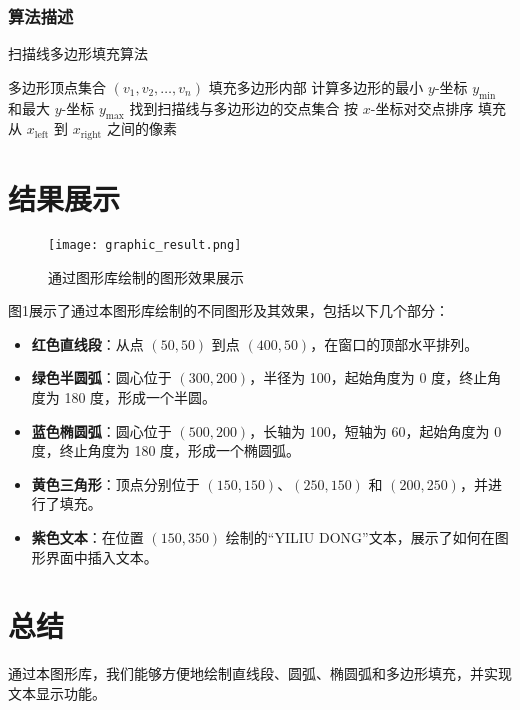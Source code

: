 \documentclass[11pt,a4paper]{article}
\begin{document}
\subsubsection{算法描述}
\begin{algorithm}[H]
\caption{扫描线多边形填充算法}
\begin{algorithmic}[1]
\Require 多边形顶点集合 \((v_1, v_2, \dots, v_n)\)
\Ensure 填充多边形内部
\State 计算多边形的最小 \(y\)-坐标 \(y_{\text{min}}\) 和最大 \(y\)-坐标 \(y_{\text{max}}\)
    \State 找到扫描线与多边形边的交点集合
    \State 按 \(x\)-坐标对交点排序
        \State 填充从 \(x_{\text{left}}\) 到 \(x_{\text{right}}\) 之间的像素
    \EndFor
\EndFor
\end{algorithmic}
\end{algorithm}

\section{结果展示}

\begin{figure}[htbp]
    \centering
    \texttt{[image: graphic\_result.png]}
    \caption{通过图形库绘制的图形效果展示}
    \label{fig:result}
\end{figure}

图1展示了通过本图形库绘制的不同图形及其效果，包括以下几个部分：

\begin{itemize}
    \item \textbf{红色直线段}：从点 \((50, 50)\) 到点 \((400, 50)\)，在窗口的顶部水平排列。
    \item \textbf{绿色半圆弧}：圆心位于 \((300, 200)\)，半径为 100，起始角度为 0 度，终止角度为 180 度，形成一个半圆。
    \item \textbf{蓝色椭圆弧}：圆心位于 \((500, 200)\)，长轴为 100，短轴为 60，起始角度为 0 度，终止角度为 180 度，形成一个椭圆弧。
    \item \textbf{黄色三角形}：顶点分别位于 \((150, 150)\)、\((250, 150)\) 和 \((200, 250)\)，并进行了填充。
    \item \textbf{紫色文本}：在位置 \((150, 350)\) 绘制的“YILIU DONG”文本，展示了如何在图形界面中插入文本。
\end{itemize}

\section{总结}
通过本图形库，我们能够方便地绘制直线段、圆弧、椭圆弧和多边形填充，并实现文本显示功能。
\end{document}

